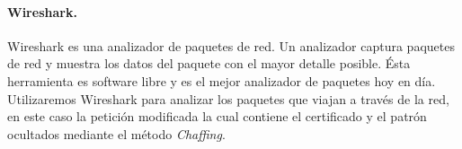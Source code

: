 \documentclass[12pt, a4paper, titlepage]{report}
\begin{document}
				\paragraph{Wireshark. \\}
				Wireshark es una analizador de paquetes de red. Un analizador captura paquetes de red y muestra los datos del paquete con el mayor detalle posible. Ésta herramienta es software libre y es el mejor analizador de paquetes hoy en día. \cite{refWireshark} Utilizaremos Wireshark para analizar los paquetes que viajan a través de la red, en este caso la petición modificada la cual contiene el certificado y el patrón ocultados mediante el método \textit{Chaffing}.
				

\end{document}
